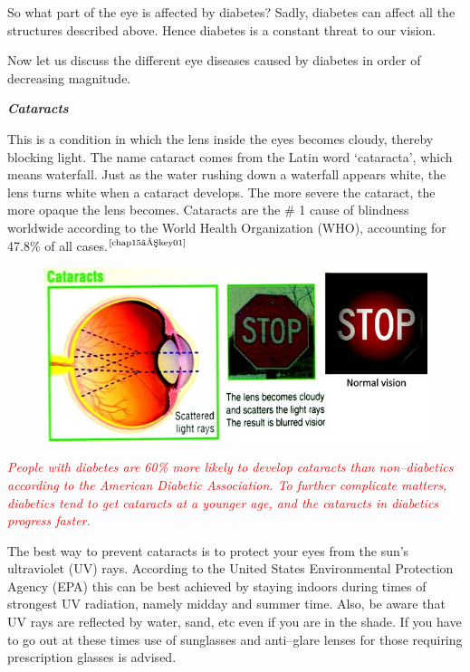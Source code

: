 So what part of the eye is affected by diabetes? Sadly, diabetes can affect all the structures described above. Hence diabetes is a constant threat to our vision.


Now let us discuss the different eye diseases caused by diabetes in order of decreasing magnitude.

\noindent\textbf{\textit{Cataracts}}

This is a condition in which the lens inside the eyes becomes cloudy, thereby blocking light. The name cataract comes from the Latin word ‘cataracta’, which means waterfall. Just as the water rushing down a waterfall appears white, the lens turns white when a cataract deve\-lops. The more severe the cataract, the more opaque the lens becomes. Cataracts are the \# 1 cause of blindness worldwide according to the World Health Organization (WHO), accounting for 47.8\% of all cases.$^{\text{\cite{chap15–key01}}}$

\begin{figure}[h]
\centering
\includegraphics[scale=2.3]{images/050.jpg}
\end{figure}

\textcolor{red}{\textit{People with diabetes are 60\% more likely to develop cataracts than non–diabetics according to the American Diabetic Association. To further complicate matters, diabetics tend to get cataracts at a younger age, and the cataracts in diabetics progress faster.}}

The best way to prevent cataracts is to protect your eyes from the sun’s ultraviolet (UV) rays. According to the United States Environmental Protection Agency (EPA) this can be best achieved by staying indoors during times of strongest UV radiation, namely midday and summer time. Also, be aware that UV rays are reflected by water, sand, etc even if you are in the shade. If you have to go out at these times use of sunglasses and anti–glare lenses for those requiring prescription glasses is advised.

